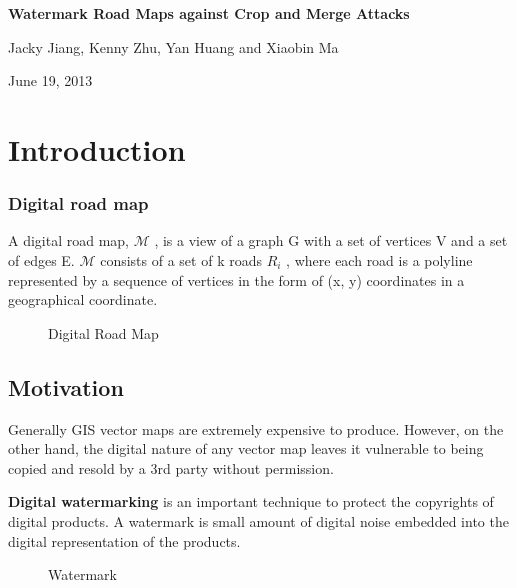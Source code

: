 \documentclass[
	paper=128mm:96mm,	%
	fontsize=11pt,					%
	pagesize,							%
	parskip=half-,					%
	numbers=noendperiod,	%
	captions=nooneline			%
	]{scrartcl}							%
\newcommand*{\mytitle}{Watermark Road Maps against Crop and Merge Attacks}		%
\newcommand*{\mytitleontitlepage}{\mytitle}	%
\newcommand*{\myauthor}{Jacky Jiang, Kenny Zhu, Yan Huang and Xiaobin Ma}				%
\newcommand*{\mydate}{June 19, 2013}						%
\newcommand*{\myred}[1]{\textcolor{myred}{#1}}
\newcommand{\M}{\mathcal{M}}
\theoremstyle{mythmstyle}
\begin{document}
%
%
\thispagestyle{empty}
%
\begin{flushright}
	\vspace{0.6cm}
	\color{white}\sffamily
	{\bfseries\Large\mytitleontitlepage\par}
	\normalsize
   \myauthor\par
   \mydate
	\vfill
\end{flushright}

\clearpage
%
%
\tableofcontents
\clearpage

%
%
\section{Introduction}
%
%
\subsubsection*{Digital road map}
A digital road map, $\M$ , is a view of a graph G with a set of
vertices V and a set of edges E. $\M$ consists of a set of k roads
$R_i$ , where each road is a polyline represented by a sequence of vertices in the form of (x, y) coordinates in a geographical coordinate.

\begin{figure}
%
\label{a}
\centering \caption{Digital Road Map}
\end{figure}
\clearpage
\subsection*{Motivation}
Generally GIS vector maps are extremely expensive to
produce. However, on the other hand, the digital nature 
of any vector map leaves it vulnerable to being copied 
and resold by a 3rd party without permission.


\myred{\bf Digital watermarking} is an important technique to protect the copyrights of digital products. 
\clearpage
A watermark is small amount of digital noise embedded into the digital representation of the products. 
\begin{figure}[h]
\centering
{}
\caption{Watermark}
\label{fig:notemark}
\end{figure}
\clearpage
\end{document}
